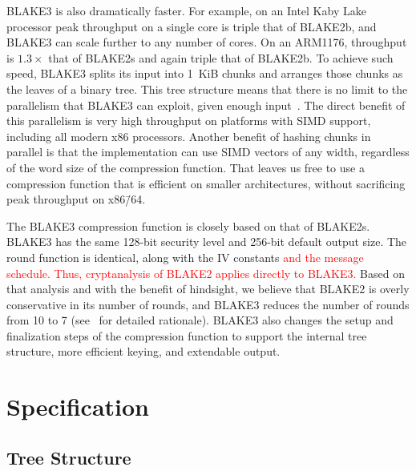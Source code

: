\documentclass[11pt,notitlepage,a4paper]{article}
\newcommand{\alert}[1]{\textcolor{red}{#1}}
\begin{document}
BLAKE3 is also dramatically faster.
For example, on an Intel Kaby Lake processor peak throughput on a single core is triple
that of BLAKE2b, and BLAKE3 can scale further to any number of cores. On an
ARM1176, throughput is $1.3\times$ that of BLAKE2s and again triple that of
BLAKE2b.
To achieve such speed, BLAKE3 splits its input into 1~KiB chunks and
arranges those chunks as the leaves of a binary tree. 
This tree structure means that there is no limit to the parallelism that
BLAKE3 can exploit, given enough input~\cite{DBLP:journals/tosc/AtighehchiB17,DBLP:journals/tc/AtighehchiR17}. 
The direct benefit of this parallelism is very high throughput on
platforms with SIMD support, including all modern x86 processors.
Another benefit of hashing chunks in parallel is that the implementation
can use SIMD vectors of any width, regardless of the word size of the
compression function. 
That leaves us free to use a compression function that is efficient on
smaller architectures, without sacrificing peak throughput on x86\=/64.

The BLAKE3 compression function is closely based on that of BLAKE2s.
BLAKE3 has the same 128-bit security level and 256-bit default output
size. The round function is identical, along with the IV constants \alert{and
the message schedule. Thus, cryptanalysis of BLAKE2 applies directly to
BLAKE3.} Based on that analysis and with the benefit of hindsight, we
believe that BLAKE2 is overly conservative in its number of rounds, and
BLAKE3 reduces the number of rounds from 10 to 7 (see~\cite{TMC} for
detailed rationale).
BLAKE3 also changes the setup and finalization steps of the compression
function to support the internal tree structure, more efficient keying,
and extendable output.

\section{Specification}\label{sec:specification}

\subsection{Tree Structure}\label{sec:tree}
\end{document}
